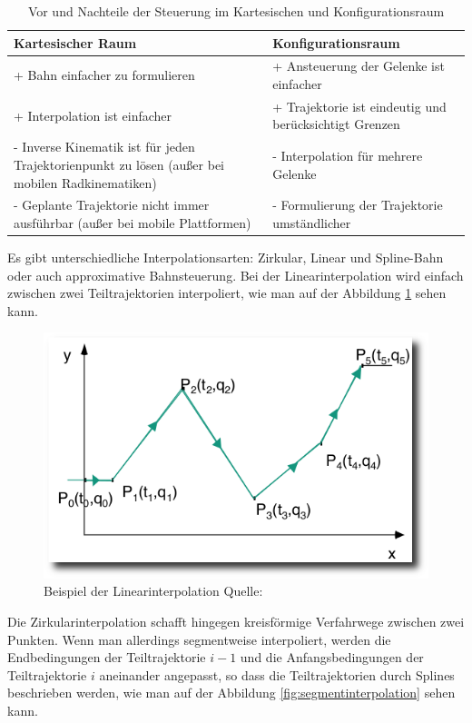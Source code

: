 \begin{table}[h]
		\centering
		\begin{tabular}{| p{7cm} | p{7cm}|}
\hline
\textbf{Kartesischer Raum} & \textbf{Konfigurationsraum}\\
\hline
+ Bahn einfacher zu formulieren & + Ansteuerung der Gelenke ist
einfacher\\
+ Interpolation ist einfacher & + Trajektorie ist eindeutig und
berücksichtigt Grenzen\\

- Inverse Kinematik ist für jeden Trajektorienpunkt zu lösen (außer bei mobilen Radkinematiken) & - Interpolation für mehrere
Gelenke\\
- Geplante Trajektorie nicht immer ausführbar (außer bei mobile Plattformen) & - Formulierung der Trajektorie umständlicher\\
\hline
		\end{tabular}
		\caption{\label{fig:steurungProContra} Vor und Nachteile der Steuerung im Kartesischen und Konfigurationsraum \citep{rob1}}
		\end{table}	
Es gibt unterschiedliche Interpolationsarten:
Zirkular, Linear und Spline-Bahn oder auch approximative Bahnsteuerung.
Bei der Linearinterpolation wird einfach zwischen zwei Teiltrajektorien interpoliert, wie man auf der Abbildung \ref{fig:linearinterpolation} sehen kann.
\begin{figure}[h]
	\center
	\includegraphics[scale=0.35]{graphics/linearinterpolation.png}
	\caption{\label{fig:linearinterpolation} Beispiel der Linearinterpolation Quelle: \citep{rob1}}
\end{figure}
Die Zirkularinterpolation schafft hingegen kreisförmige Verfahrwege zwischen zwei Punkten.
Wenn man allerdings segmentweise interpoliert, werden die Endbedingungen der Teiltrajektorie $i-1$ und die Anfangsbedingungen der Teiltrajektorie $i$ aneinander angepasst, so dass die Teiltrajektorien durch Splines beschrieben werden, wie man auf der Abbildung \ref{fig:segmentinterpolation} sehen kann.
